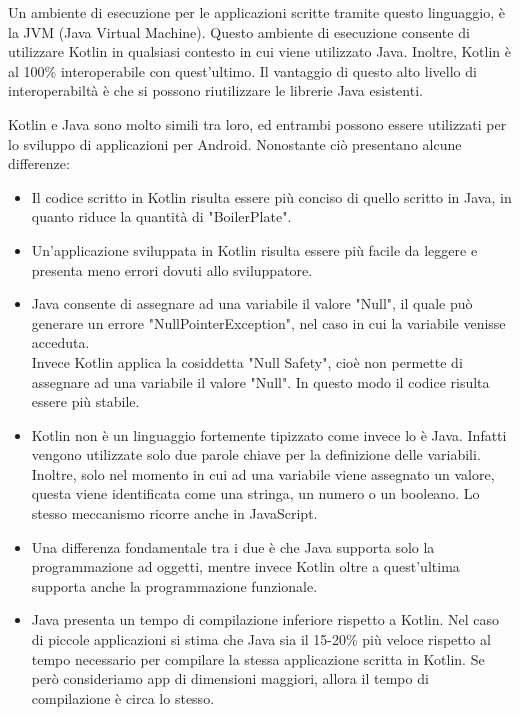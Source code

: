 Un ambiente di esecuzione per le applicazioni scritte tramite questo linguaggio, \`e la JVM {}(Java Virtual Machine). Questo ambiente di esecuzione consente di utilizzare Kotlin in
qualsiasi contesto in cui viene utilizzato Java. Inoltre, Kotlin \`e al 100\% interoperabile con quest'ultimo. Il vantaggio di questo alto livello di interoperabilt\`a \`e che si possono riutilizzare le librerie Java esistenti\cite{kotlin}.

Kotlin e Java sono molto simili tra loro, ed entrambi possono essere utilizzati per lo sviluppo di applicazioni per Android. Nonostante ci\`o presentano alcune differenze\cite{KotlinBaeldung}:
\begin{itemize}
      \item Il codice scritto in Kotlin risulta essere pi\`u conciso di quello scritto in Java, in quanto riduce la quantit\`a di "BoilerPlate".
      \item Un'applicazione sviluppata in Kotlin risulta essere pi\`u facile da leggere e presenta meno errori dovuti allo sviluppatore.
      \item Java consente di assegnare ad una variabile il valore "Null", il quale pu\`o generare un errore "NullPointerException", nel caso in cui la variabile venisse acceduta.\\ Invece
            Kotlin applica la cosiddetta "Null Safety", cio\`e non permette di assegnare ad una variabile il valore "Null". In questo modo il codice risulta essere pi\`u stabile.
      \item Kotlin non \`e un linguaggio fortemente tipizzato come invece lo \`e Java. Infatti vengono utilizzate solo due parole chiave per la definizione delle variabili. Inoltre, solo nel momento in cui ad una variabile viene assegnato un valore, questa viene
            identificata come una stringa, un numero o un booleano. Lo stesso meccanismo ricorre anche in JavaScript.
      \item Una differenza fondamentale tra i due \`e che Java supporta solo la programmazione ad oggetti, mentre invece Kotlin oltre a quest'ultima supporta anche la programmazione funzionale.
      \item Java presenta un tempo di compilazione inferiore rispetto a Kotlin. Nel caso di piccole applicazioni si stima che Java sia il 15-20\% pi\`u veloce rispetto
            al tempo necessario per compilare la stessa applicazione scritta in Kotlin. Se per\`o consideriamo app di dimensioni maggiori, allora il tempo di compilazione \`e circa lo stesso.

\end{itemize}

